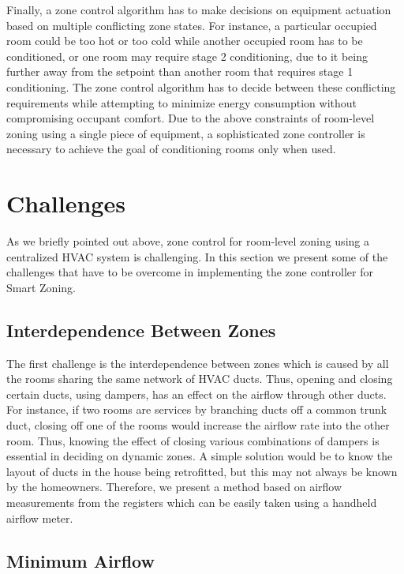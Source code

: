 
Finally, a zone control algorithm has to make decisions on equipment actuation
based on multiple conflicting zone states. For instance, a particular occupied room could
be too hot or too cold while another occupied room has to be conditioned, or one
room may require stage 2 conditioning, due to it being further away from the
setpoint than another room that requires stage 1 conditioning. The zone control
algorithm has to decide between these conflicting requirements while attempting
to minimize energy consumption without compromising occupant comfort. Due to the
above constraints of room-level zoning using a single piece of equipment, a
sophisticated zone controller is necessary to achieve the goal of conditioning
rooms only when used. 

\section{Challenges}
As we briefly pointed out above, zone control for room-level zoning using a
centralized HVAC system is challenging. In this section we present some of the
challenges that have to be overcome in implementing the zone controller for
Smart Zoning. 


\subsection{Interdependence Between Zones}

The first challenge is the interdependence between zones which is caused by all
the rooms sharing the same network of HVAC ducts. Thus, opening and closing
certain ducts, using dampers, has an effect on the airflow through other
ducts. For instance, if two rooms are services by branching ducts off a common
trunk duct, closing off one of the rooms would increase the airflow rate into
the other room. Thus, knowing the effect of closing various combinations of
dampers is essential in deciding on dynamic zones. A simple solution would be to
know the layout of ducts in the house being retrofitted, but this may not always
be known by the homeowners. Therefore, we present a method based on airflow
measurements from the registers which can be easily taken using a handheld
airflow meter.


\subsection{Minimum Airflow}
\label{sec:minAirflow}

